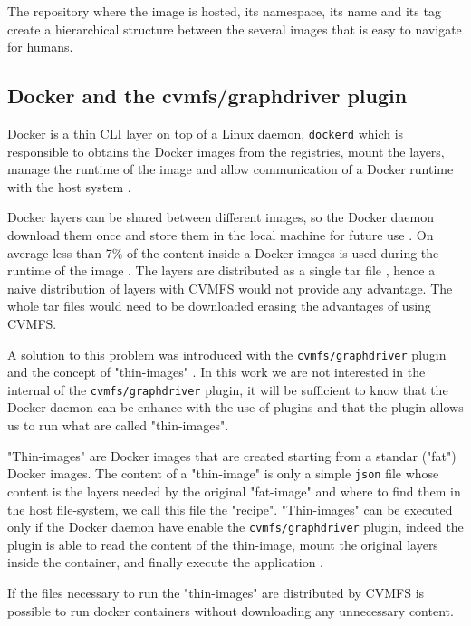 The repository where the image is hosted, its namespace, its name and its tag
create a hierarchical structure between the several images that is easy to
navigate for humans.

\subsection{Docker and the cvmfs/graphdriver plugin}
\label{subsec:docker-thin-images}

Docker is a thin CLI layer on top of a Linux daemon, \texttt{dockerd} which is
responsible to obtains the Docker images from the registries, mount the layers,
manage the runtime of the image and allow communication of a Docker runtime
with the host system \cite{docker:overview}.

Docker layers can be shared between different images, so the Docker daemon
download them once and store them in the local machine for future use
\cite{docker:storage}. On average less than 7\% of the content inside a Docker
images is used during the runtime of the image \cite{slacker}. The layers are
distributed as a single tar file \cite{oci:image-filesystem}, hence a naive
distribution of layers with CVMFS would not provide any advantage. The whole
tar files would need to be downloaded erasing the advantages of using CVMFS.

A solution to this problem was introduced with the \texttt{cvmfs/graphdriver}
plugin and the concept of "thin-images" \cite{graphdriver-plugin}. In this work
we are not interested in the internal of the \texttt{cvmfs/graphdriver} plugin,
it will be sufficient to know that the Docker daemon can be enhance with the
use of plugins \cite{docker:plugin} and that the plugin allows us to run what
are called "thin-images".

"Thin-images" are Docker images that are created starting from a standar
("fat") Docker images. The content of a "thin-image" is only a simple
\texttt{json} file whose content is the layers needed by the original
"fat-image" and where to find them in the host file-system, we call this file
the "recipe". "Thin-images" can be executed only if the Docker daemon have
enable the \texttt{cvmfs/graphdriver} plugin, indeed the plugin is able to read
the content of the thin-image, mount the original layers inside the container,
and finally execute the application \cite{graphdriver-plugin}.

If the files necessary to run the "thin-images" are distributed by CVMFS is
possible to run docker containers without downloading any unnecessary content.

